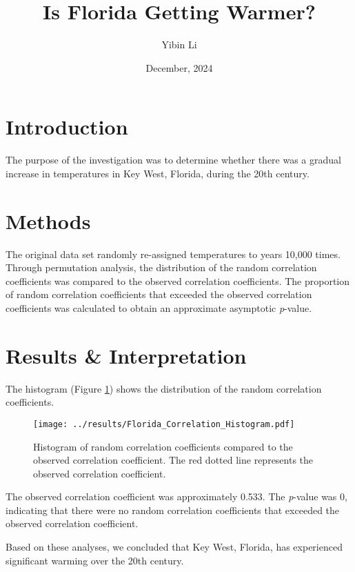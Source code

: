 \documentclass[a4paper]{article}
\title{\textbf{Is Florida Getting Warmer?}}
\author{Yibin Li}
\date{December, 2024}
\begin{document}
\maketitle

\section{Introduction}
The purpose of the investigation was to determine whether there was a gradual increase in temperatures in Key West, Florida, during the 20th century.

\section{Methods}
The original data set randomly re-assigned temperatures to years 10,000 times. Through permutation analysis, the distribution of the random correlation coefficients was compared to the observed correlation coefficients. The proportion of random correlation coefficients that exceeded the observed correlation coefficients was calculated to obtain an approximate asymptotic \textit{p}-value.

\section{Results \& Interpretation}
The histogram (Figure \ref{fig:correlation-histogram}) shows the distribution of the random correlation coefficients. 

\begin{figure}[H] %
    \centering
    \texttt{[image: ../results/Florida\_Correlation\_Histogram.pdf]} 
    \captionsetup{font=footnotesize}
    \caption{Histogram of random correlation coefficients compared to the observed correlation coefficient. The red dotted line represents the observed correlation coefficient.}
    \label{fig:correlation-histogram}
\end{figure}

The observed correlation coefficient was approximately 0.533. The \textit{p}-value was 0, indicating that there were no random correlation coefficients that exceeded the observed correlation coefficient. 

Based on these analyses, we concluded that Key West, Florida, has experienced significant warming over the 20th century.
\end{document}
